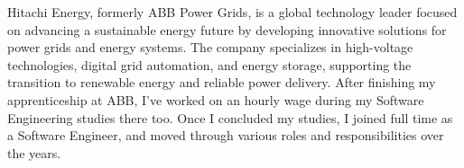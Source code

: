 


\begin{cvparagraph}
	\langen
	{
		Hitachi Energy, formerly ABB Power Grids, is a global technology leader focused on advancing a sustainable energy future by developing innovative solutions for power grids and energy systems. The company specializes in high-voltage technologies, digital grid automation, and energy storage, supporting the transition to renewable energy and reliable power delivery. \newline
		After finishing my apprenticeship at ABB, I've worked on an hourly wage during my Software Engineering studies there too. Once I concluded my studies, I joined full time as a Software Engineer, and moved through various roles and responsibilities over the years.
	}
	\langde
	{
	}
\end{cvparagraph}

